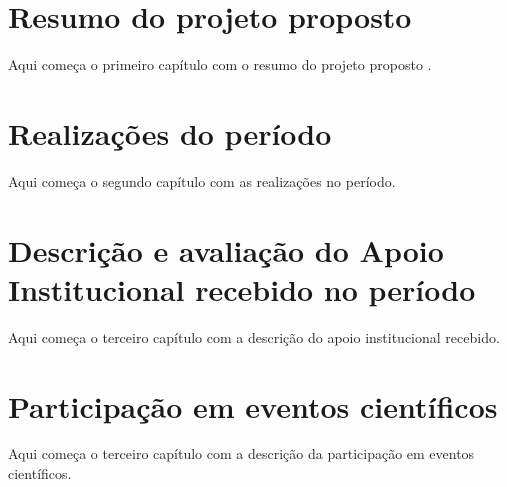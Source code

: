 \documentclass[12pt]{report}
\begin{document}
%
%
\geraTitulo
%
\folhaDeRosto
%
%
%
\tableofcontents
\thispagestyle{empty}
\clearpage
%

\sectionfont{\scshape}

\chapter{Resumo do projeto proposto}\label{chp:resumoProj} 
Aqui começa o primeiro capítulo com o resumo do projeto proposto \cite{Gradvohl2014}.

\chapter{Realizações do período}\label{chp:realizacoes}
Aqui começa o segundo capítulo com as realizações no período.

\chapter{Descrição e avaliação do Apoio Institucional recebido no período}\label{chp:apoioInst}
Aqui começa o terceiro capítulo com a descrição do apoio institucional recebido.

\chapter{Participação em eventos científicos}\label{chp:particEvento}
Aqui começa o terceiro capítulo com a descrição da participação em eventos científicos.




\end{document}
